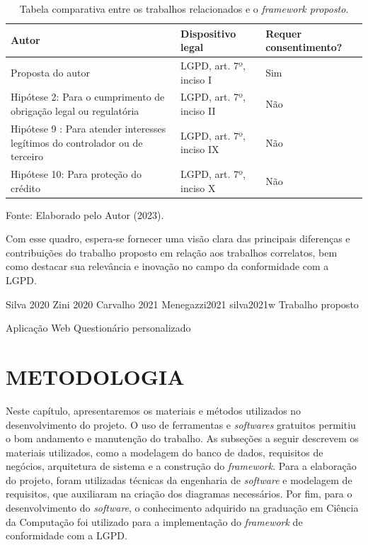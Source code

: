 \documentclass[
	12pt,				%
	openright,			%
	oneside,			%
	a4paper,			%
	english,			%
	french,				%
	spanish,			%
	brazil,				%
	]{abntex2}
\begin{document}
\begin{table}[ht]
    \centering
    \caption{Tabela comparativa entre os trabalhos relacionados e o \textit{framework proposto}.}
    \label{tab: requisitos de tratamento de dados}
    \begin{tabular}{|p{5.5 cm}|p{4.5cm}|p{5.5cm}|} 
        \hline
        \textbf{Autor} & \textbf{Dispositivo legal} & \textbf{Requer consentimento?} \\ \hline
        
         Proposta do autor & LGPD, art. 7º, inciso I & Sim \\ \hline
         
        Hipótese 2: Para o cumprimento de obrigação legal ou regulatória & LGPD, art. 7º, inciso II & Não  \\ \hline
        
        Hipótese 9 : Para atender interesses legítimos do controlador ou de terceiro & LGPD, art. 7º, inciso IX & Não  \\ \hline
        
        Hipótese 10: Para proteção do crédito & LGPD, art. 7º, inciso X & Não  \\ \hline
    \end{tabular}
    \newline \newline Fonte: Elaborado pelo Autor (2023).
\end{table}
Com esse quadro, espera-se fornecer uma visão clara das principais diferenças e contribuições do trabalho proposto em relação aos trabalhos correlatos, bem como destacar sua relevância e inovação no campo da conformidade com a LGPD.


Silva 2020
Zini 2020
Carvalho 2021
Menegazzi2021
silva2021w
Trabalho proposto

Aplicação Web
Questionário personalizado



\chapter{METODOLOGIA}
\label{ch: materiais e métodos}

Neste capítulo, apresentaremos os materiais e métodos utilizados no desenvolvimento do projeto. O uso de ferramentas e \textit{softwares} gratuitos permitiu o bom andamento e manutenção do trabalho. As subseções a seguir descrevem os materiais utilizados, como a modelagem do banco de dados, requisitos de negócios, arquitetura de sistema e a construção do \textit{framework}. Para a elaboração do projeto, foram utilizadas técnicas da engenharia de \textit{software} e modelagem de requisitos, que auxiliaram na criação dos diagramas necessários. Por fim, para o desenvolvimento do \textit{software}, o conhecimento adquirido na graduação em Ciência da Computação foi utilizado para a implementação do \textit{framework} de conformidade com a LGPD.
\end{document}
